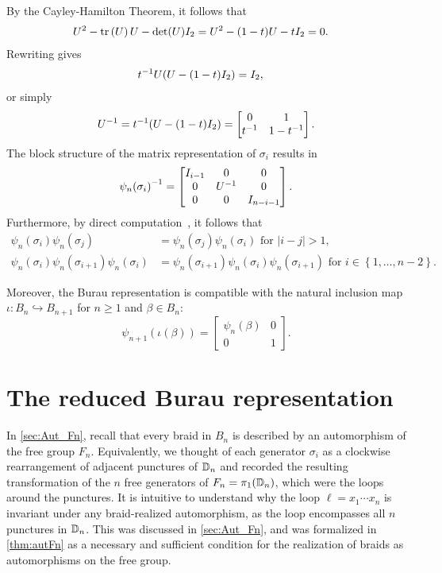 By the Cayley-Hamilton Theorem, it follows that~\cite{Kassel2008}
\begin{align}
    U^2 - \textrm{tr}\left(U\right)U - \det(U)I_2 &= U^2 - (1-t)U - tI_2 = 0.
\end{align}
Rewriting gives
\begin{align}
    { t }^{-1}U(U - (1-t)I_2) &= I_2,
\end{align}
or simply
\begin{equation}
    { U }^{-1} = { t }^{-1}(U - (1-t)I_2) = \begin{bmatrix}
        0 & 1 \\ { t }^{-1} & 1-{ t }^{-1}
    \end{bmatrix}.
\end{equation}
The block structure of the matrix representation of $\sigma_i$ results in
\begin{align}
    { \psi_n(\sigma_i) }^{-1} = \begin{bmatrix}
        I_{i-1} & 0 & 0 \\
        0 & { U }^{-1} & 0 \\
        0 & 0 & I_{n-i-1}
    \end{bmatrix}.
\end{align}
Furthermore, by direct computation~\cite{Kassel2008}, it follows that
\begin{align}
    \psi_n(\sigma_i)\psi_n(\sigma_j) &= \psi_n(\sigma_j)\psi_n(\sigma_i) \textrm{ for } |i-j|>1, \\
    \psi_n(\sigma_i)\psi_n(\sigma_{i+1})\psi_n(\sigma_i) &= \psi_n(\sigma_{i+1})\psi_n(\sigma_i)\psi_n(\sigma_{i+1}) \textrm{ for } i\in\left\{ 1,\dots,n-2 \right\}.
\end{align}

Moreover, the Burau representation is compatible with the natural inclusion map $\iota:B_n\hookrightarrow B_{n+1}$ for $n\geq 1$ and $\beta\in B_n$:
\begin{equation}
    \psi_{n+1}(\iota(\beta)) = \begin{bmatrix}
        \psi_n(\beta) & 0 \\
        0 & 1
    \end{bmatrix}.
\end{equation}

\section{The reduced Burau representation}
In \cref{sec:Aut_Fn}, recall that every braid in $B_n$ is described by an automorphism of the free group $F_n$. Equivalently, we thought of each generator $\sigma_i$ as a clockwise rearrangement of adjacent punctures of $\mathbb{D}_n$ and recorded the resulting transformation of the $n$ free generators of $F_n = \pi_1(\mathbb{D}_n)$, which were the loops around the punctures. It is intuitive to understand why the loop $\ell=x_1\cdots x_n$ is invariant under any braid-realized automorphism, as the loop  encompasses all $n$ punctures in $\mathbb{D}_n$. This was discussed in \cref{sec:Aut_Fn}, and was formalized in \cref{thm:autFn} as a necessary and sufficient condition for the realization of braids as automorphisms on the free group.

